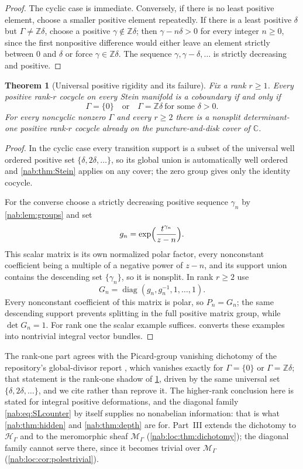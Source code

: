 \documentclass[11pt,letterpaper]{article}
\newtheorem{theorem}{Theorem}[section]
\theoremstyle{definition}
\theoremstyle{remark}
\newcommand{\C}{\mathbb C}
\newcommand{\Z}{\mathbb Z}
\newcommand{\HH}{\mathscr H_\Gamma}
\newcommand{\MM}{\mathscr M_\Gamma}
\numberwithin{equation}{section}
\begin{document}
\begin{proof}
The cyclic case is immediate. Conversely, if there is no least positive
element, choose a smaller positive element repeatedly. If there is a least
positive $\delta$ but $\Gamma\neq\Z\delta$, choose a positive
$\gamma\notin\Z\delta$; then $\gamma-n\delta>0$ for every integer $n\geq0$,
since the first nonpositive difference would either leave an element strictly
between $0$ and $\delta$ or force $\gamma\in\Z\delta$. The sequence
$\gamma,\gamma-\delta,\ldots$ is strictly decreasing and positive.
\end{proof}

\begin{theorem}[Universal positive rigidity and its failure]
\label{nab:thm:dichotomy}
Fix a rank $r\geq1$. Every positive rank-$r$ cocycle on every Stein manifold
is a coboundary if and only if
\[
 \Gamma=\{0\}\quad\text{or}\quad\Gamma=\Z\delta\ \text{for some }\delta>0.
\]
For every noncyclic nonzero $\Gamma$ and every $r\geq2$ there is a nonsplit
determinant-one positive rank-$r$ cocycle already on the puncture-and-disk
cover of $\C$.
\end{theorem}

\begin{proof}
In the cyclic case every transition support is a subset of the universal well
ordered positive set $\{\delta,2\delta,\ldots\}$, so its global union is
automatically well ordered and \cref{nab:thm:Stein} applies on any cover; the
zero group gives only the identity cocycle.

For the converse choose a strictly decreasing positive sequence $\gamma_n$ by
\cref{nab:lem:groups} and set
\[
 g_n=\exp\Bigl(\frac{t^{\gamma_n}}{z-n}\Bigr).
\]
This scalar matrix is its own normalized polar factor, every nonconstant
coefficient being a multiple of a negative power of $z-n$, and its support
union contains the descending set $\{\gamma_n\}$, so it is nonsplit. In rank
$r\geq2$ use
\begin{equation}\label{nab:eq:SLcounter}
 G_n=\operatorname{diag}(g_n,g_n^{-1},1,\ldots,1).
\end{equation}
Every nonconstant coefficient of this matrix is polar, so $P_n=G_n$; the same
descending support prevents splitting in the full positive matrix group, while
$\det G_n=1$. For rank one the scalar example suffices.
 converts these examples into nontrivial
integral vector bundles.
\end{proof}

The rank-one part agrees with the Picard-group vanishing dichotomy of the
repository's global-divisor report \cite{RepoGlobal}, which vanishes exactly
for $\Gamma=\{0\}$ or $\Gamma=\Z\delta$; that statement is the rank-one shadow
of \cref{nab:thm:dichotomy}, driven by the same universal set
$\{\delta,2\delta,\ldots\}$, and we cite rather than reprove it. The
higher-rank conclusion here is stated for integral positive deformations, and
the diagonal family \eqref{nab:eq:SLcounter} by itself supplies no nonabelian
information: that is what \cref{nab:thm:hidden} and \cref{nab:thm:depth} are
for. Part~III extends the dichotomy to $\HH$ and to the meromorphic sheaf $\MM$
(\cref{nab:loc:thm:dichotomy}); the diagonal family cannot serve there, since
it becomes trivial over $\MM$ (\cref{nab:loc:cor:polestrivial}).
\end{document}
